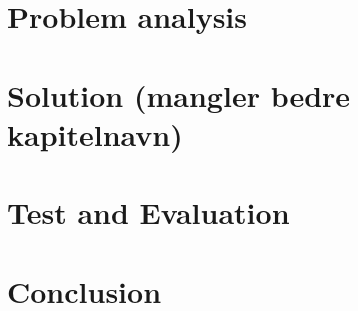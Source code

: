 %
%
%
%
% 


\pagestyle{empty} %



\cleardoublepage
{}
\pagestyle{fancy} %
\tableofcontents
\listoftodos

\cleardoublepage

\chapter{Problem analysis}






\clearpage

\chapter{Solution (mangler bedre kapitelnavn)}








\chapter{Test and Evaluation}


\chapter{Conclusion}

\printbibliography[heading=bibintoc]
\label{bib:mybiblio}
\appendix

